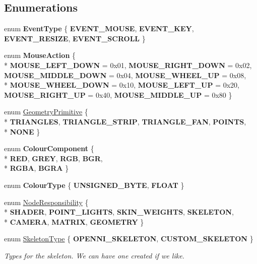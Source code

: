 \subsection*{Enumerations}
\begin{DoxyCompactItemize}
\item 
enum {\bfseries Event\-Type} \{ {\bfseries E\-V\-E\-N\-T\-\_\-\-M\-O\-U\-S\-E}, 
{\bfseries E\-V\-E\-N\-T\-\_\-\-K\-E\-Y}, 
{\bfseries E\-V\-E\-N\-T\-\_\-\-R\-E\-S\-I\-Z\-E}, 
{\bfseries E\-V\-E\-N\-T\-\_\-\-S\-C\-R\-O\-L\-L}
 \}
\item 
enum {\bfseries Mouse\-Action} \{ \\*
{\bfseries M\-O\-U\-S\-E\-\_\-\-L\-E\-F\-T\-\_\-\-D\-O\-W\-N} = 0x01, 
{\bfseries M\-O\-U\-S\-E\-\_\-\-R\-I\-G\-H\-T\-\_\-\-D\-O\-W\-N} = 0x02, 
{\bfseries M\-O\-U\-S\-E\-\_\-\-M\-I\-D\-D\-L\-E\-\_\-\-D\-O\-W\-N} = 0x04, 
{\bfseries M\-O\-U\-S\-E\-\_\-\-W\-H\-E\-E\-L\-\_\-\-U\-P} = 0x08, 
\\*
{\bfseries M\-O\-U\-S\-E\-\_\-\-W\-H\-E\-E\-L\-\_\-\-D\-O\-W\-N} = 0x10, 
{\bfseries M\-O\-U\-S\-E\-\_\-\-L\-E\-F\-T\-\_\-\-U\-P} = 0x20, 
{\bfseries M\-O\-U\-S\-E\-\_\-\-R\-I\-G\-H\-T\-\_\-\-U\-P} = 0x40, 
{\bfseries M\-O\-U\-S\-E\-\_\-\-M\-I\-D\-D\-L\-E\-\_\-\-U\-P} = 0x80
 \}
\item 
enum \hyperlink{namespaces9_ad57d1332f8fd67d23f6a1d3520ab785c}{Geometry\-Primitive} \{ \\*
{\bfseries T\-R\-I\-A\-N\-G\-L\-E\-S}, 
{\bfseries T\-R\-I\-A\-N\-G\-L\-E\-\_\-\-S\-T\-R\-I\-P}, 
{\bfseries T\-R\-I\-A\-N\-G\-L\-E\-\_\-\-F\-A\-N}, 
{\bfseries P\-O\-I\-N\-T\-S}, 
\\*
{\bfseries N\-O\-N\-E}
 \}
\item 
enum {\bfseries Colour\-Component} \{ \\*
{\bfseries R\-E\-D}, 
{\bfseries G\-R\-E\-Y}, 
{\bfseries R\-G\-B}, 
{\bfseries B\-G\-R}, 
\\*
{\bfseries R\-G\-B\-A}, 
{\bfseries B\-G\-R\-A}
 \}
\item 
enum {\bfseries Colour\-Type} \{ {\bfseries U\-N\-S\-I\-G\-N\-E\-D\-\_\-\-B\-Y\-T\-E}, 
{\bfseries F\-L\-O\-A\-T}
 \}
\item 
enum \hyperlink{namespaces9_a5c291cd938e865ef990a7f53eec62f36}{Node\-Responsibility} \{ \\*
{\bfseries S\-H\-A\-D\-E\-R}, 
{\bfseries P\-O\-I\-N\-T\-\_\-\-L\-I\-G\-H\-T\-S}, 
{\bfseries S\-K\-I\-N\-\_\-\-W\-E\-I\-G\-H\-T\-S}, 
{\bfseries S\-K\-E\-L\-E\-T\-O\-N}, 
\\*
{\bfseries C\-A\-M\-E\-R\-A}, 
{\bfseries M\-A\-T\-R\-I\-X}, 
{\bfseries G\-E\-O\-M\-E\-T\-R\-Y}
 \}
\item 
enum \hyperlink{namespaces9_a4b242c485a2df431daccfd4a6876cc11}{Skeleton\-Type} \{ {\bfseries O\-P\-E\-N\-N\-I\-\_\-\-S\-K\-E\-L\-E\-T\-O\-N}, 
{\bfseries C\-U\-S\-T\-O\-M\-\_\-\-S\-K\-E\-L\-E\-T\-O\-N}
 \}
\begin{DoxyCompactList}\small\item\em Types for the skeleton. We can have one created if we like. \end{DoxyCompactList}\end{DoxyCompactItemize}

